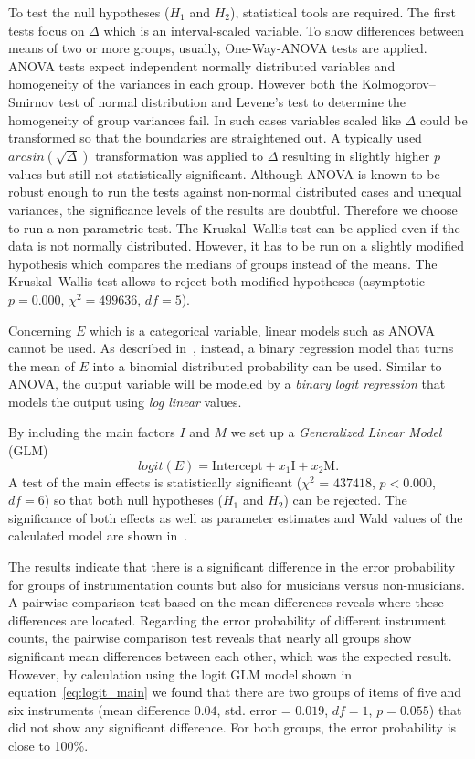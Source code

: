 To test the null hypotheses ($H_1$ and $H_2$), statistical tools are required.
The first tests focus on $\Delta$ which is an interval-scaled variable. To show differences between means of two or more groups, usually, One-Way-ANOVA tests are applied. ANOVA tests expect independent normally distributed variables and homogeneity of the variances in each group. However both the Kolmogorov--Smirnov test of normal distribution and Levene's test to determine the homogeneity of group variances fail. In such cases variables scaled like $\Delta$ could be transformed so that the boundaries are straightened out. A typically used $arcsin(\sqrt{\Delta})$ transformation was applied to $\Delta$ resulting in slightly higher $p$ values but still not statistically significant. Although ANOVA is known to be robust enough to run the tests against non-normal distributed cases and unequal variances, the significance levels of the results are doubtful. Therefore we choose to run a non-parametric test. The Kruskal--Wallis test can be applied even if the data is not normally distributed. However, it has to be run on a slightly modified hypothesis which compares the medians of groups instead of the means. The Kruskal--Wallis test allows to reject both modified hypotheses (asymptotic $p = 0.000$, $\chi^2 = 499636$, $df=5$).
\par
Concerning $E$ which is a categorical variable, linear models such as ANOVA cannot be used.
As described in~\cite{jaeger08}, instead, a binary regression model that turns the mean of $E$ into a binomial distributed probability can be used.
Similar to ANOVA, the output variable will be modeled by a \emph{binary logit regression} that models the output using \emph{log linear} values.
\par
By including the main factors $I$ and $M$ we set up a \emph{Generalized Linear Model} (GLM)
\begin{equation}
    logit(E) =  \text{Intercept} + x_1 \text{I} + x_2 \text{M} .
    \label{eq:logit_main}
\end{equation}
A test of the main effects is statistically significant ($\chi^2$ = $437418$, $p < 0.000$, $df = 6$) so that both null hypotheses ($H_1$ and $H_2$) can be rejected. The significance of both effects as well as parameter estimates and Wald values of the calculated model are shown in~\cite{stoeter13}.
\par
The results indicate that there is a significant difference in the error probability for groups of instrumentation counts but also for musicians versus non-musicians. A pairwise comparison test based on the mean differences reveals where these differences are located. Regarding the error probability of different instrument counts, the pairwise comparison test reveals that nearly all groups show significant mean differences between each other, which was the expected result. However, by calculation using the logit GLM model shown in equation~\ref{eq:logit_main} we found that there are two groups of items of five and six instruments (mean difference $0.04$, std. error = $0.019$, $df = 1$, $p = 0.055$) that did not show any significant difference. For both groups, the error probability is close to 100\%.
